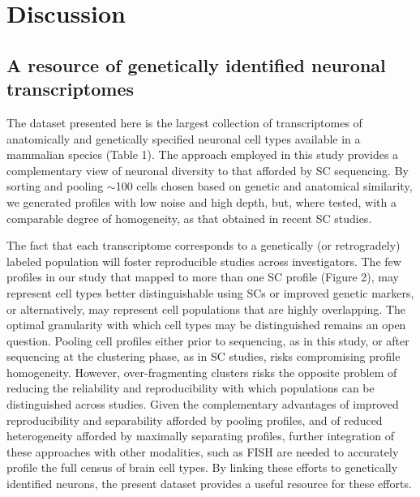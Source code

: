 
\section{Discussion}

\subsection{A resource of genetically identified neuronal transcriptomes}

The dataset presented here is the largest collection of transcriptomes of anatomically and genetically specified neuronal cell types available in a mammalian species (Table 1). The approach employed in this study provides a complementary view of neuronal diversity to that afforded by SC sequencing. By sorting and pooling $\sim$100 cells chosen based on genetic and anatomical similarity, we generated profiles with low noise and high depth, but, where tested, with a comparable degree of homogeneity, as that obtained in recent SC studies. 

The fact that each transcriptome corresponds to a genetically (or retrogradely) labeled population will foster reproducible studies across investigators. The few profiles in our study that mapped to more than one SC profile (Figure 2), may represent cell types better distinguishable using SCs or improved genetic markers, or alternatively, may represent cell populations that are highly overlapping. The optimal granularity with which cell types may be distinguished remains an open question. Pooling cell profiles either prior to sequencing, as in this study, or after sequencing at the clustering phase, as in SC studies, risks compromising profile homogeneity. However, over-fragmenting clusters risks the opposite problem of reducing the reliability and reproducibility with which populations can be distinguished across studies. Given the complementary advantages of improved reproducibility and separability afforded by pooling profiles, and of reduced heterogeneity afforded by maximally separating profiles, further integration of these approaches with other modalities, such as FISH \citep{Moffitt_2016} are needed to accurately profile the full census of brain cell types. By linking these efforts to genetically identified neurons, the present dataset provides a useful resource for these efforts. 

